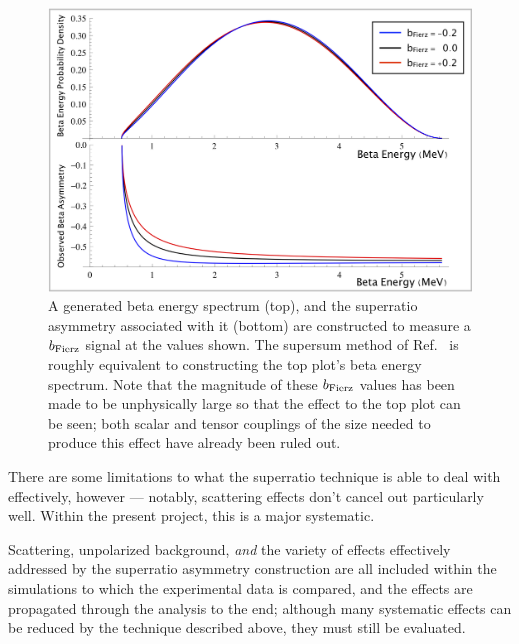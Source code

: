 \begin{figure}[h!!tb]
	\centering
	\includegraphics[width=.999\linewidth]
	{Figures/Fierz_Signature.png}
	\caption[Generated Beta Energy Spectrum and Superratio Asymmetry to Measure $\bFierz$]{A generated beta energy spectrum (top), and the superratio asymmetry associated with it (bottom) are constructed to measure a $\bFierz$ signal at the values shown.  The supersum method of Ref.~\cite{UCNA_first_Fierz} is roughly equivalent to constructing the top plot's beta energy spectrum.  Note that the magnitude of these $\bFierz$ values has been made to be unphysically large so that the effect to the top plot can be seen; both scalar and tensor couplings of the size needed to produce this effect have already been ruled out. 
	}	\label{fig:FierzSignature}
\end{figure}


There are some limitations to what the superratio technique is able to deal with effectively, however --- notably, scattering effects don't cancel out particularly well.  Within the present project, this is a major systematic.  

Scattering, unpolarized background, \emph{and} the variety of effects effectively addressed by the superratio asymmetry construction are all included within the simulations to which the experimental data is compared, and the effects are propagated through the analysis to the end;  although many systematic effects can be reduced by the technique described above, they must still be evaluated.








